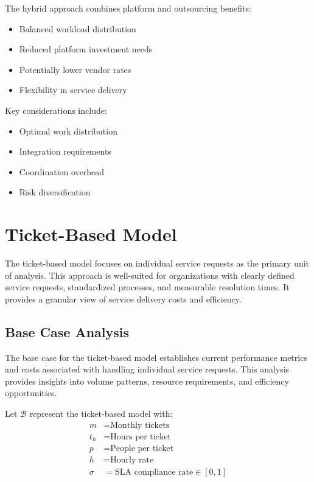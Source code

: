 \documentclass[12pt,a4paper]{article}
\newenvironment{definition}[1]
{\begin{mdframed}[style=definitionstyle,frametitle={Definition: #1}]}
{\end{mdframed}}
\newenvironment{explanation}
{\begin{mdframed}[style=explanationstyle,frametitle={Explanation}]}
{\end{mdframed}}
\begin{document}
\begin{explanation}
The hybrid approach combines platform and outsourcing benefits:
\begin{itemize}
    \item Balanced workload distribution
    \item Reduced platform investment needs
    \item Potentially lower vendor rates
    \item Flexibility in service delivery
\end{itemize}

Key considerations include:
\begin{itemize}
    \item Optimal work distribution
    \item Integration requirements
    \item Coordination overhead
    \item Risk diversification
\end{itemize}
\end{explanation}

\section{Ticket-Based Model}
The ticket-based model focuses on individual service requests as the primary unit of analysis. This approach is well-suited for organizations with clearly defined service requests, standardized processes, and measurable resolution times. It provides a granular view of service delivery costs and efficiency.

\subsection{Base Case Analysis}
The base case for the ticket-based model establishes current performance metrics and costs associated with handling individual service requests. This analysis provides insights into volume patterns, resource requirements, and efficiency opportunities.

\begin{definition}{Ticket Model Variables}
Let $\mathcal{B}$ represent the ticket-based model with:
\begin{align*}
    m &= \text{Monthly tickets} \\
    t_h &= \text{Hours per ticket} \\
    p &= \text{People per ticket} \\
    h &= \text{Hourly rate} \\
    \sigma &= \text{SLA compliance rate} \in [0,1]
\end{align*}
\end{definition}
\end{document}
